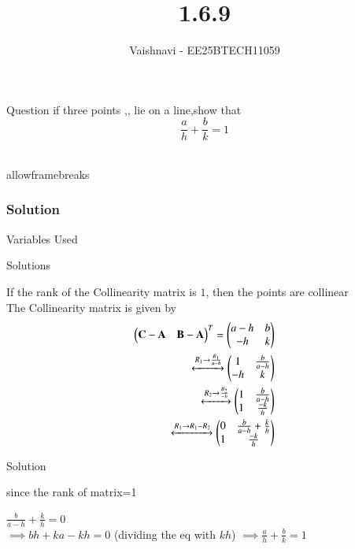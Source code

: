 \documentclass{beamer}
\title %
{1.6.9}
\author %
{Vaishnavi - EE25BTECH11059}
\begin{document}
\frame{\titlepage}
\begin{frame}{Question}
if three points ,, lie on a line,show that
\[
\frac{a}{h} + \frac{b}{k} = 1
\]
\\
 

\end{frame}
\begin{frame}{allowframebreaks}
\frametitle{Solution}
\begin{table}[H]    
  \centering
  
  \caption{Variables Used}
  \label{tab:1.6.9}
\end{table}

\end{frame}
\begin{frame}{Solutions}

If the rank of the Collinearity matrix is $1$, then the points are collinear\\
   The Collinearity matrix is given by\\
\begin{align}
    \begin{pmatrix}
    \mathbf{C}-\mathbf{A} & \mathbf{B}-\mathbf{A}
  \end{pmatrix}^T = \begin{pmatrix}
    a-h & b
    \\
    -h & k
    \end{pmatrix}\\
  \xleftrightarrow[]{R_1 \rightarrow {\frac{R_1}{a-h}}}
 \begin{pmatrix}
    1 & \frac{b}{a-h}
    \\
    -h & k
    \end{pmatrix}\\
     \xleftrightarrow[]{R_2 \rightarrow {\frac{R_2}{-h}}}
 \begin{pmatrix}
     1 & \frac{b}{a-h}
    \\
     1 & \frac{-k}{h}
    \end{pmatrix}\\
       \xleftrightarrow[]{R_1 \rightarrow R_1- R_2}
 \begin{pmatrix}
    0 & \frac{b}{a-h}+\frac{k}{h} 
    \\
    1 & \frac{-k}{h}
      \end{pmatrix} 
\end{align}

\end{frame}


\begin{frame}{Solution}
    
since the rank of matrix=1
\begin{center}
$\frac{b}{a-h}+\frac{k}{h} =0$ 
\\
$\implies bh+ka-kh=0$ (dividing the eq with $kh$)
$\implies \frac{a}{h}+\frac{b}{k}=1$
\end{center}
\end{frame}
\end{document}
